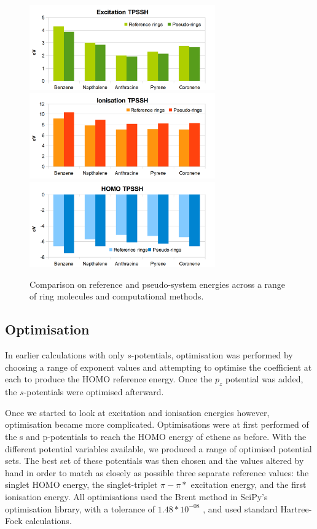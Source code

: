 \documentclass[journal=jctcce,manuscript=article]{achemso}
\begin{document}
\begin{figure}[h]
\includegraphics[width=8cm]{ring_tpssh_excitation}
\includegraphics[width=8cm]{ring_tpssh_ionisation}
\includegraphics[width=8cm]{ring_tpssh_homo}
\caption{Comparison on reference and pseudo-system energies across a range of ring molecules and computational methods.}
\label{fig:rings_graphs}
\end{figure}

\subsection{Optimisation}

In earlier calculations with only \(s\)-potentials, optimisation was performed by choosing a range of exponent values and attempting to optimise the coefficient at each to produce the HOMO reference energy. Once the \(p_{z}\) potential was added, the \(s\)-potentials were optimised afterward. 

Once we started to look at excitation and ionisation energies however, optimisation became more complicated. Optimisations were at first performed of the s and p-potentials to reach the HOMO energy of ethene as before. With the different potential variables available, we produced a range of optimised potential sets. The best set of these potentials was then chosen and the values altered by hand in order to match as closely as possible three separate reference values: the singlet HOMO energy, the singlet-triplet \(\pi-\pi*\) excitation energy, and the first ionisation energy. All optimisations used the Brent method in SciPy's optimisation library, with a tolerance of \(1.48*10^{-08}\) \cite{scipy}, and used standard Hartree-Fock calculations.
\end{document}
